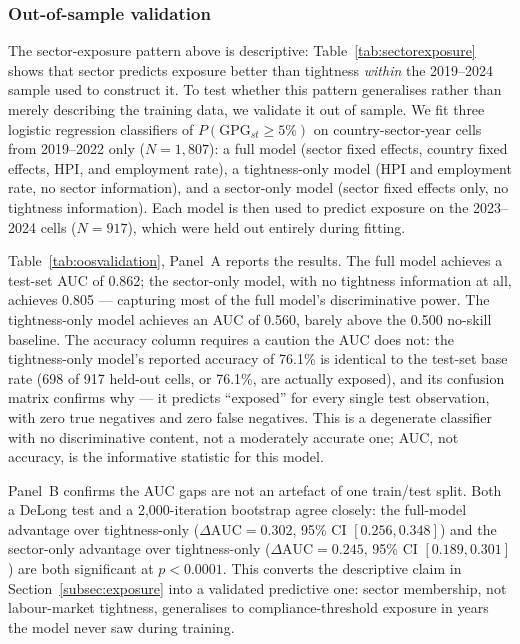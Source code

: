 \documentclass[12pt,a4paper]{article}
\begin{document}
\subsubsection{Out-of-sample validation}
\label{subsec:oos_validation}

The sector-exposure pattern above is descriptive: Table~\ref{tab:sectorexposure}
shows that sector predicts exposure better than tightness \emph{within} the
2019--2024 sample used to construct it.  To test whether this pattern
generalises rather than merely describing the training data, we validate it
out of sample.  We fit three logistic regression classifiers of
$P(\text{GPG}_{st} \geq 5\%)$ on country-sector-year cells from 2019--2022
only ($N=1{,}807$): a full model (sector fixed effects, country fixed
effects, HPI, and employment rate), a tightness-only model (HPI and
employment rate, no sector information), and a sector-only model (sector
fixed effects only, no tightness information).  Each model is then used to
predict exposure on the 2023--2024 cells ($N=917$), which were held out
entirely during fitting.

Table~\ref{tab:oosvalidation}, Panel~A reports the results.  The full model
achieves a test-set AUC of 0.862; the sector-only model, with no tightness
information at all, achieves 0.805 --- capturing most of the full model's
discriminative power.  The tightness-only model achieves an AUC of 0.560,
barely above the 0.500 no-skill baseline.  The accuracy column requires a
caution the AUC does not: the tightness-only model's reported accuracy of
76.1\% is identical to the test-set base rate (698 of 917 held-out cells,
or 76.1\%, are actually exposed), and its confusion matrix confirms why ---
it predicts ``exposed'' for every single test observation, with zero true
negatives and zero false negatives.  This is a degenerate classifier with no
discriminative content, not a moderately accurate one; AUC, not accuracy, is
the informative statistic for this model.

Panel~B confirms the AUC gaps are not an artefact of one train/test split.
Both a DeLong test and a 2,000-iteration bootstrap agree closely: the
full-model advantage over tightness-only ($\Delta\text{AUC}=0.302$, 95\% CI
$[0.256, 0.348]$) and the sector-only advantage over tightness-only
($\Delta\text{AUC}=0.245$, 95\% CI $[0.189, 0.301]$) are both significant at
$p<0.0001$.  This converts the descriptive claim in
Section~\ref{subsec:exposure} into a validated predictive one: sector
membership, not labour-market tightness, generalises to compliance-threshold
exposure in years the model never saw during training.
\end{document}
